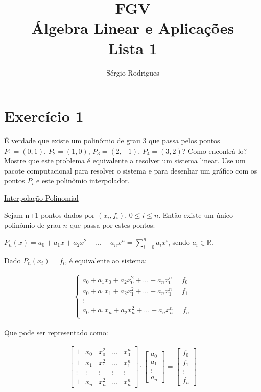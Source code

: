 \documentclass[12pt,a4paper]{article}
\author{Sérgio Rodrigues}
\title{FGV\\ Álgebra Linear e Aplicações\\ Lista 1}
\begin{document}
\maketitle


\newpage
\section*{Exercício 1}
É verdade que existe um polinômio de grau 3 que passa pelos pontos $ P_1= (0,1) $, $ P_2= (1,0) $, $ P_3= (2,-1) $, $ P_4= (3,2) $? Como encontrá-lo? Mostre que este problema é equivalente a resolver um sistema linear. Use um pacote computacional para resolver o sistema e para desenhar um gráfico com os pontos
$ P_i $ e este polinômio interpolador.

\underline{Interpolação Polinomial}

Sejam n+1 pontos dados por $ (x_i, f_i) $, $ 0 \leq i \leq n $. Então existe um único polinômio de grau $ n $ que passa por estes pontos: 

$ P_n(x) = a_0 + a_1x+ a_2x^2 + ... + a_nx^n = \sum_{i=0}^{n} a_ix^i$, sendo $ a_i \in \mathbb{R} $.

Dado $ P_n(x_i) = f_i$, é equivalente ao sistema:

\begin{align*}
	\begin{cases}
		a_0 + a_1x_0+ a_2x_0^2 + ... + a_nx_0^n = f_0\\
		a_0 + a_1x_1+ a_2x_1^2 + ... + a_nx_1^n = f_1\\
		\vdots\\
		a_0 + a_1x_n+ a_2x_n^2 + ... + a_nx_n^n = f_n\\
	\end{cases}
\end{align*}

Que pode ser representado como:

\begin{align*}
\begin{bmatrix}
1 & x_0 & x_0^2 & ... & x_0^n \\ 
1 & x_1 & x_1^2 & ... & x_1^n \\ 
\vdots & \vdots & \vdots & \vdots &  \vdots\\ 
1 & x_n & x_n^2 & ... & x_n^n
\end{bmatrix} 
\cdot
\begin{bmatrix}
a_0\\
a_1\\
\vdots\\
a_n
\end{bmatrix}
=
\begin{bmatrix}
f_0\\
f_1\\
\vdots\\
f_n
\end{bmatrix}
\end{align*}
\end{document}
